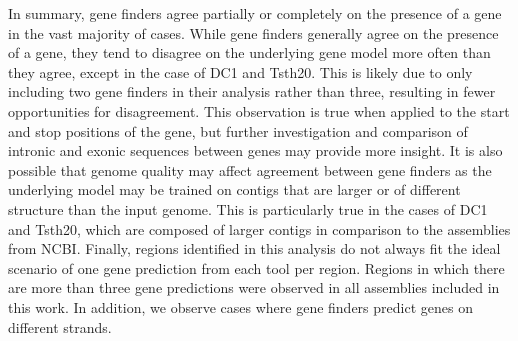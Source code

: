 In summary, gene finders agree partially or completely on the presence
of a gene in the vast majority of cases. While gene finders generally
agree on the presence of a gene, they tend to disagree on the
underlying gene model more often than they agree, except in the
case of DC1 and Tsth20. This is likely due to only including two gene
finders in their analysis rather than three, resulting in fewer
opportunities for disagreement. This observation is true when applied
to the start and stop positions of the gene, but further investigation
and comparison of intronic and exonic sequences between genes may
provide more insight. It is also possible that genome quality may
affect agreement between gene finders as the underlying model may be
trained on contigs that are larger or of different structure than the
input genome. This is particularly true in the cases of
DC1 and Tsth20, which are composed of larger contigs in comparison to
the assemblies from NCBI. Finally, regions identified in this analysis
do not always fit the ideal scenario of one gene prediction from each
tool per region. Regions in which there are more than three gene
predictions were observed in all assemblies included in this work. In
addition, we observe cases where gene finders predict genes on
different strands.
